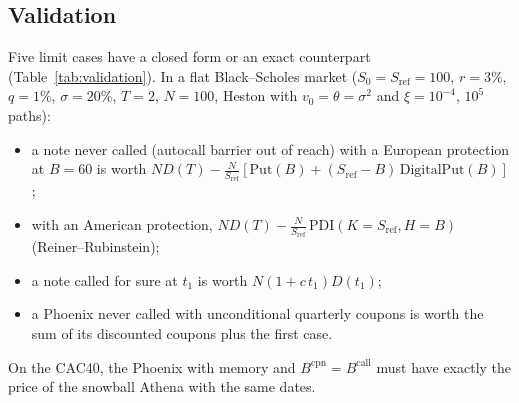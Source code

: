 \documentclass[11pt,a4paper]{article}
\newcommand{\Sref}{S_{\mathrm{ref}}}
\begin{document}
\subsection{Validation}
Five limit cases have a closed form or an exact counterpart (Table~\ref{tab:validation}). In a flat Black--Scholes
market ($S_0 = \Sref = 100$, $r = 3\%$, $q = 1\%$, $\sigma = 20\%$, $T = 2$, $N = 100$, Heston with $v_0 = \theta = \sigma^2$
and $\xi = 10^{-4}$, $10^5$ paths):
\begin{itemize}
\item a note never called (autocall barrier out of reach) with a European protection at $B = 60$ is worth
$N D(T) - \frac{N}{\Sref}\left[\mathrm{Put}(B) + (\Sref - B)\,\mathrm{DigitalPut}(B)\right]$;
\item with an American protection, $N D(T) - \frac{N}{\Sref}\,\mathrm{PDI}(K = \Sref, H = B)$ (Reiner--Rubinstein);
\item a note called for sure at $t_1$ is worth $N(1 + c\, t_1) D(t_1)$;
\item a Phoenix never called with unconditional quarterly coupons is worth the sum of its discounted coupons plus
the first case.
\end{itemize}
On the CAC40, the Phoenix with memory and $B^{\mathrm{cpn}} = B^{\mathrm{call}}$ must have exactly the price of the
snowball Athena with the same dates.

\begin{table}[h]
\centering
{}
\caption{Validation of the pricer.}
\label{tab:validation}
\end{table}
\end{document}
